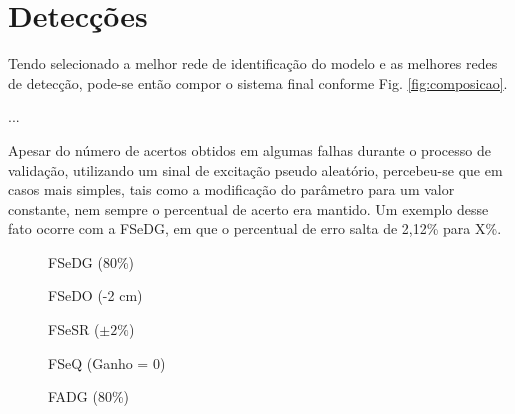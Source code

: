 \section{Detecções}
Tendo selecionado a melhor rede de identificação do modelo e as melhores redes
de detecção, pode-se então compor o sistema final conforme Fig.
\ref{fig:composicao}.

...

Apesar do número de acertos obtidos em algumas falhas durante o processo de
validação, utilizando um sinal de excitação pseudo aleatório, percebeu-se que em
casos mais simples, tais como a modificação do parâmetro para um valor
constante, nem sempre o percentual de acerto era mantido. Um exemplo desse fato
ocorre com a FSeDG, em que o percentual de erro salta de 2,12\% para X\%.


\begin{figure}[htb]
\footnotesize
\centering

\vspace{1cm}
\caption{FSeDG (80\%)}
\label{fig:fsedg}
\end{figure}

\begin{figure}[htb]
\footnotesize
\centering

\vspace{1cm}
\caption{FSeDO (-2 cm)}
\label{fig:fsedo}
\end{figure}

\begin{figure}[htb]
\footnotesize
\centering

\vspace{1cm}
\caption{FSeSR ($\pm 2\%$)}
\label{fig:fsesr}
\end{figure}

\begin{figure}[htb]
\footnotesize
\centering

\vspace{1cm}
\caption{FSeQ (Ganho = 0)}
\label{fig:fseq}
\end{figure}

\begin{figure}[htb]
\footnotesize
\centering

\vspace{1cm}
\caption{FADG (80\%)}
\label{fig:fadg}
\end{figure}

